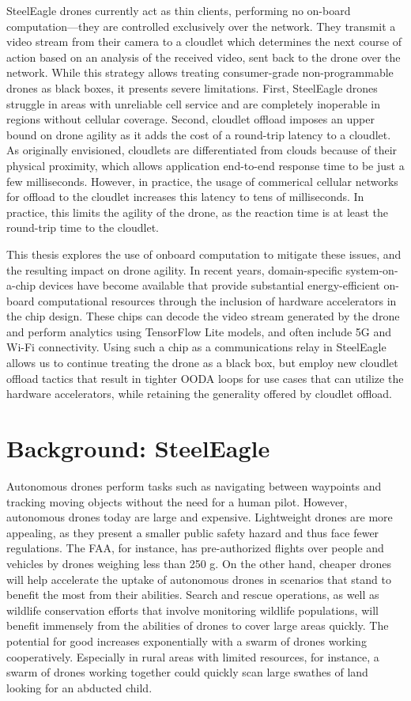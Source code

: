 SteelEagle drones currently act as thin clients, performing no on-board
computation---they are controlled exclusively over the network. They transmit a
video stream from their camera to a cloudlet which determines the next course
of action based on an analysis of the received video, sent back to the drone
over the network. While this strategy allows treating consumer-grade
non-programmable drones as black boxes, it presents severe limitations. First,
SteelEagle drones struggle in areas with unreliable cell service and are
completely inoperable in regions without cellular coverage. Second, cloudlet
offload imposes an upper bound on drone agility as it adds the cost of a
round-trip latency to a cloudlet. As originally envisioned, cloudlets are
differentiated from clouds because of their physical proximity, which allows
application end-to-end response time to be just a few milliseconds. However, in
practice, the usage of commerical cellular networks for offload to the cloudlet
increases this latency to tens of milliseconds. In practice, this limits the
agility of the drone, as the reaction time is at least the round-trip time to
the cloudlet.

This thesis explores the use of onboard computation to mitigate these issues,
and the resulting impact on drone agility. In recent years, domain-specific
system-on-a-chip devices have become available that provide substantial
energy-efficient on-board computational resources through the inclusion of
hardware accelerators in the chip design. These chips can decode the video
stream generated by the drone and perform analytics using TensorFlow Lite
models, and often include 5G and Wi-Fi connectivity. Using such a chip as a
communications relay in SteelEagle allows us to continue treating the drone as
a black box, but employ new cloudlet offload tactics that result in tighter
OODA loops for use cases that can utilize the hardware accelerators, while
retaining the generality offered by cloudlet offload.

\section{Background: SteelEagle}

Autonomous drones perform tasks such as navigating between waypoints and
tracking moving objects without the need for a human pilot.  However,
autonomous drones today are large and expensive. Lightweight drones are more
appealing, as they present a smaller public safety hazard and thus face fewer
regulations. The FAA, for instance, has pre-authorized flights over people and
vehicles by drones weighing less than 250 g. On the other hand, cheaper drones
will help accelerate the uptake of autonomous drones in scenarios that stand to
benefit the most from their abilities. Search and rescue operations, as well as
wildlife conservation efforts that involve monitoring wildlife populations,
will benefit immensely from the abilities of drones to cover large areas
quickly. The potential for good increases exponentially with a swarm of drones
working cooperatively. Especially in rural areas with limited resources, for
instance, a swarm of drones working together could quickly scan large swathes
of land looking for an abducted child.

